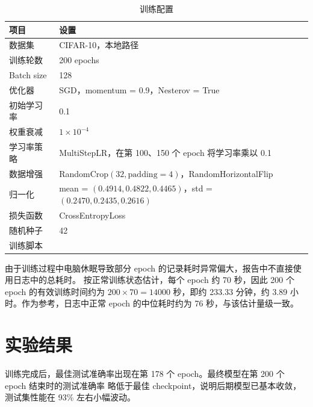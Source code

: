 \documentclass[UTF8]{ctexart}
\begin{document}
\begin{table}[H]
    \centering
    \caption{训练配置}
    \begin{tabularx}{\textwidth}{lY}
        \toprule
        项目 & 设置 \\
        \midrule
        数据集 & CIFAR-10，本地路径  \\
        训练轮数 & 200 epochs \\
        Batch size & 128 \\
        优化器 & SGD，momentum = 0.9，Nesterov = True \\
        初始学习率 & 0.1 \\
        权重衰减 & $1\times10^{-4}$ \\
        学习率策略 & MultiStepLR，在第 100、150 个 epoch 将学习率乘以 0.1 \\
        数据增强 & RandomCrop$(32,\mathrm{padding}=4)$，RandomHorizontalFlip \\
        归一化 & mean = $(0.4914, 0.4822, 0.4465)$，std = $(0.2470, 0.2435, 0.2616)$ \\
        损失函数 & CrossEntropyLoss \\
        随机种子 & 42 \\
        训练脚本 &  \\
        \bottomrule
    \end{tabularx}
\end{table}

由于训练过程中电脑休眠导致部分 epoch 的记录耗时异常偏大，报告中不直接使用日志中的总耗时。
按正常训练状态估计，每个 epoch 约 70 秒，因此 200 个 epoch 的有效训练时间约为
$200\times70=14000$ 秒，即约 233.33 分钟，约 3.89 小时。作为参考，日志中正常 epoch
的中位耗时约为 76 秒，与该估计量级一致。

\section{实验结果}

训练完成后，最佳测试准确率出现在第 178 个 epoch。最终模型在第 200 个 epoch 结束时的测试准确率
略低于最佳 checkpoint，说明后期模型已基本收敛，测试集性能在 93\% 左右小幅波动。
\end{document}
